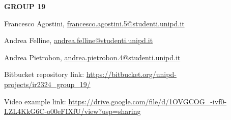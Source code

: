 \newpage
\begin{center}

   {\LARGE \textbf{GROUP 19}}
    
    \vspace*{2cm}
    \large
    
    Francesco Agostini, \href{mailto:francesco.agostini.5@studenti.unipd.it}{francesco.agostini.5@studenti.unipd.it}
    
    Andrea Felline, \href{mailto:andrea.felline@studenti.unipd.it}{andrea.felline@studenti.unipd.it}
    
    Andrea Pietrobon, \href{mailto:andrea.pietrobon.4@studenti.unipd.it}{andrea.pietrobon.4@studenti.unipd.it}
    
    \vspace*{2cm}
    \large
    
    Bitbucket repository link: \href{https://bitbucket.org/unipd-projects/ir2324_group_19/}{https://bitbucket.org/unipd-projects/ir2324\_group\_19/}
    
    Video example link: \href{https://drive.google.com/file/d/1OVGCOG_-ivf0-LZL4KkG6C-o00eFIXfU/view?usp=sharing}{https://drive.google.com/file/d/1OVGCOG\_-ivf0-LZL4KkG6C-o00eFIXfU/view?usp=sharing}
\end{center}
